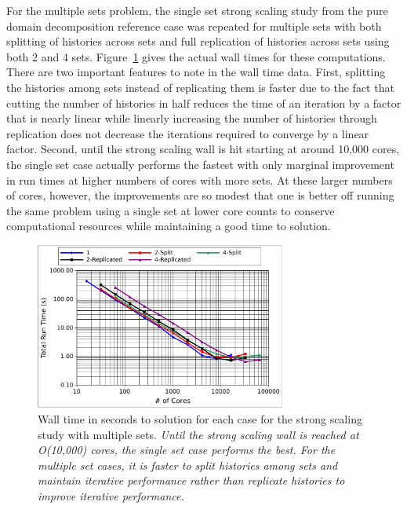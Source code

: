 \documentclass{snamc2013}
\begin{document}
For the multiple sets problem, the single set strong scaling study
from the pure domain decomposition reference case was repeated for
multiple sets with both splitting of histories across sets and full
replication of histories across sets using both 2 and 4
sets. Figure~\ref{fig:titan_strong_ms_time} gives the actual wall
times for these computations. There are two important features to note
in the wall time data. First, splitting the histories among sets
instead of replicating them is faster due to the fact that cutting the
number of histories in half reduces the time of an iteration by a
factor that is nearly linear while linearly increasing the number of
histories through replication does not decrease the iterations
required to converge by a linear factor. Second, until the strong
scaling wall is hit starting at around 10,000 cores, the single set
case actually performs the fastest with only marginal improvement in
run times at higher numbers of cores with more sets. At these larger
numbers of cores, however, the improvements are so modest that one is
better off running the same problem using a single set at lower core
counts to conserve computational resources while maintaining a good
time to solution.

\begin{figure}[H]
  \begin{center}
    \includegraphics[width=3.25in]{titan_strong_ms_time.pdf}
  \end{center}
  \caption{Wall time in seconds to solution for each case for the
    strong scaling study with multiple sets. \textit{Until the strong
      scaling wall is reached at O(10,000) cores, the single set case
      performs the best. For the multiple set cases, it is faster to
      split histories among sets and maintain iterative performance
      rather than replicate histories to improve iterative
      performance.}}
  \label{fig:titan_strong_ms_time}
\end{figure}
\end{document}
